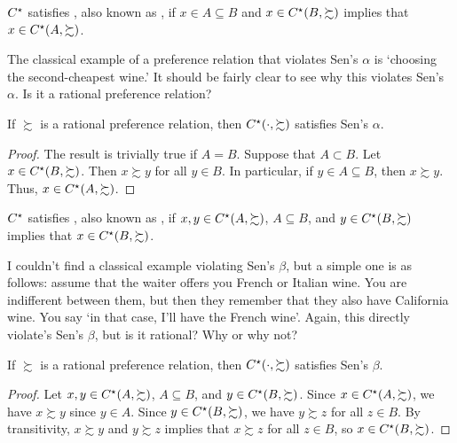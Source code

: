 \documentclass[12pt]{article}
\begin{document}
\begin{definition}
	$C^\star$ satisfies , also known as , if $x \in A \subseteq B$ and $x \in C^\star(B,\succsim)$ implies that $x \in C^\star(A,\succsim)$.
\end{definition}
\begin{remark}
	The classical example of a preference relation that violates Sen's $\alpha$ is `choosing the second-cheapest wine.' It should be fairly clear to see why this violates Sen's $\alpha$. Is it a rational preference relation?
\end{remark}

\begin{proposition}\label{prop:rational_alpha}
	If $\succsim$ is a rational preference relation, then $C^\star(\cdot,\succsim)$ satisfies Sen's $\alpha$.
\end{proposition}
\begin{proof}
	The result is trivially true if $A = B$. Suppose that $A \subset B$. Let $x \in C^\star(B,\succsim)$. Then $x \succsim y$ for all $y \in B$. In particular, if $y \in A \subseteq B$, then $x \succsim y$. Thus, $x \in C^\star(A,\succsim)$.
\end{proof}

\begin{definition}
	$C^\star$ satisfies , also known as , if $x,y \in C^\star(A,\succsim)$, $A \subseteq B$, and $y \in C^\star(B,\succsim)$ implies that $x \in C^\star(B,\succsim)$.
\end{definition}

\begin{remark}
	I couldn't find a classical example violating Sen's $\beta$, but a simple one is as follows: assume that the waiter offers you French or Italian wine. You are indifferent between them, but then they remember that they also have California wine. You say 	`in that case, I'll have the French wine'. Again, this directly violate's Sen's $\beta$, but is it rational? Why or why not?
\end{remark}

\begin{proposition}\label{prop:rational_beta}
	If $\succsim$ is a rational preference relation, then $C^\star(\cdot,\succsim)$ satisfies Sen's $\beta$.
\end{proposition}
\begin{proof}
	Let $x,y \in C^\star(A,\succsim)$, $A \subseteq B$, and $y \in C^\star(B,\succsim)$. Since $x \in C^\star(A,\succsim)$, we have $x \succsim y$ since $y \in A$. Since $y \in C^\star(B,\succsim)$, we have $y\succsim z$ for all $z \in B$. By transitivity, $x \succsim y$ and $y \succsim z$ implies that $x \succsim z$ for all $z \in B$, so $x\in C^\star(B,\succsim)$. 
\end{proof}
\end{document}
